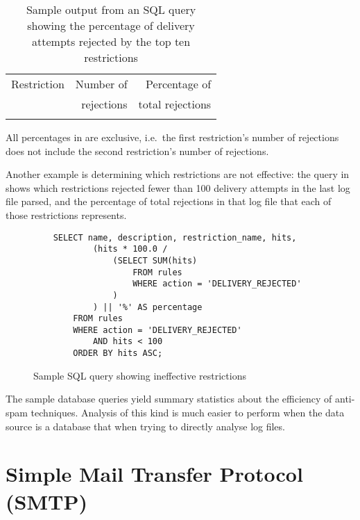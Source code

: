 \begin{table}[thbp]
    \caption{Sample output from an SQL query showing the percentage of
    delivery attempts rejected by the top ten restrictions}
    \empty{}\label{Sample output from SQL query}
    \begin{tabular}[]{lrr}
        \tabletopline{}%
        Restriction & Number of  & Percentage of    \\
                    & rejections & total rejections \\
        \tablemiddleline{}%
        
        \tablebottomline{}%
    \end{tabular}

    All percentages in  are
    exclusive, i.e.\ the first restriction's number of rejections does not
    include the second restriction's number of rejections.

\end{table}


Another example is determining which restrictions are not effective: the
query in 
shows which restrictions rejected fewer than 100 delivery attempts in the
last log file parsed, and the percentage of total rejections in that log
file that each of those restrictions represents.

\begin{figure}[thbp]
    \caption{Sample SQL query showing ineffective restrictions}
    \empty{}\label{Sample SQL query showing ineffective restrictions}
    \begin{verbatim}
    SELECT name, description, restriction_name, hits,
            (hits * 100.0 /
                (SELECT SUM(hits)
                    FROM rules
                    WHERE action = 'DELIVERY_REJECTED'
                )
            ) || '%' AS percentage
        FROM rules
        WHERE action = 'DELIVERY_REJECTED'
            AND hits < 100
        ORDER BY hits ASC;
    \end{verbatim}
\end{figure}

The sample database queries yield summary statistics about the efficiency of
anti-spam techniques.  Analysis of this kind is much easier to perform when
the data source is a database that when trying to directly analyse log
files.

\section{Simple Mail Transfer Protocol (SMTP)}

